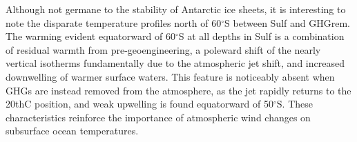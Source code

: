 \documentclass[draft,grl]{AGUTeX}  %
\begin{document}
\begin{article}
Although not germane to the stability of Antarctic ice sheets, it is interesting to note the disparate temperature profiles north of 60$^\circ$S between Sulf and GHGrem. The warming evident equatorward of 60$^\circ$S at all depths in Sulf is a combination of residual warmth from pre-geoengineering, a poleward shift of the nearly vertical isotherms fundamentally due to the atmospheric jet shift, and increased downwelling of warmer surface waters. This feature is noticeably absent when GHGs are instead removed from the atmosphere, as the jet rapidly returns to the 20thC position, and weak upwelling is found equatorward of 50$^\circ$S. These characteristics reinforce the importance of atmospheric wind changes on subsurface ocean temperatures.



\end{article}
\end{document}
